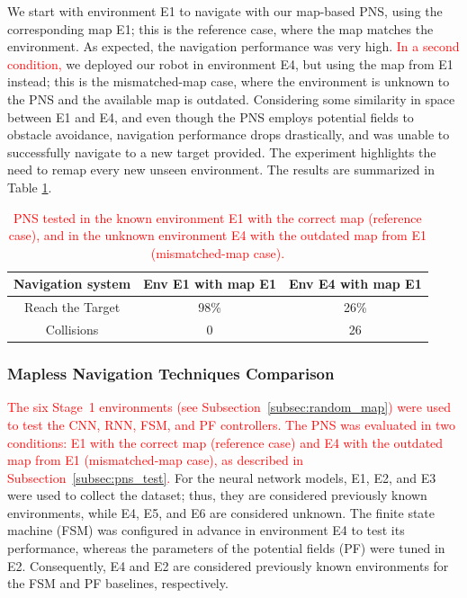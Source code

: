 \documentclass[robotics,article,submit,pdftex,moreauthors]{Definitions/mdpi}
\begin{document}
We start with environment E1 to navigate with our map-based PNS, using the corresponding map E1; this is the reference case, where the map matches the environment. As expected, the navigation performance was very high. \textcolor{red}{In a second condition,} we deployed our robot in environment E4, but using the map from E1 instead; this is the mismatched-map case, where the environment is unknown to the PNS and the available map is outdated. Considering some similarity in space between E1 and E4, and even though the PNS employs potential fields to obstacle avoidance, navigation performance drops drastically, and was unable to successfully navigate to a new target provided. The experiment highlights the need to remap every new unseen environment. The results are summarized in Table \ref{tab:nav_system}.

\begin{table}[htbp]
\centering
\caption{\textcolor{red}{PNS tested in the known environment E1 with the correct map (reference case), and in the unknown environment E4 with the outdated map from E1 (mismatched-map case).}}
\label{tab:nav_system}
\vspace{2.5pt}
\begin{tabular}{|c|c|c|}\hline
    Navigation system & Env E1 with map E1 &  Env E4 with map E1 \\ \hline
    Reach the Target & 98\%  & 26\% \\ \hline
    Collisions & 0 & 26 \\ \hline
\end{tabular}
\end{table}

\subsubsection{Mapless Navigation Techniques Comparison}

\textcolor{red}{The six Stage~1 environments (see Subsection~\ref{subsec:random_map}) were used to test the CNN, RNN, FSM, and PF controllers.} \textcolor{red}{The PNS was evaluated in two conditions: E1 with the correct map (reference case) and E4 with the outdated map from E1 (mismatched-map case), as described in Subsection~\ref{subsec:pns_test}.} For the neural network models, E1, E2, and E3 were used to collect the dataset; thus, they are considered previously known environments, while E4, E5, and E6 are considered unknown. The finite state machine (FSM) was configured in advance in environment E4 to test its performance, whereas the parameters of the potential fields (PF) were tuned in E2. Consequently, E4 and E2 are considered previously known environments for the FSM and PF baselines, respectively.
\end{document}
